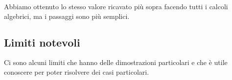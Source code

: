 % 
% 

\begin{osservazione}
Abbiamo ottenuto lo stesso valore ricavato più sopra facendo tutti i 
calcoli algebrici, ma i passaggi sono più semplici.
\end{osservazione}


\subsection{Limiti notevoli}
\label{subsec:cont_limiti_notevoli}

Ci sono alcuni limiti che hanno delle dimostrazioni particolari e che è 
utile conoscere per poter risolvere dei casi particolari.

